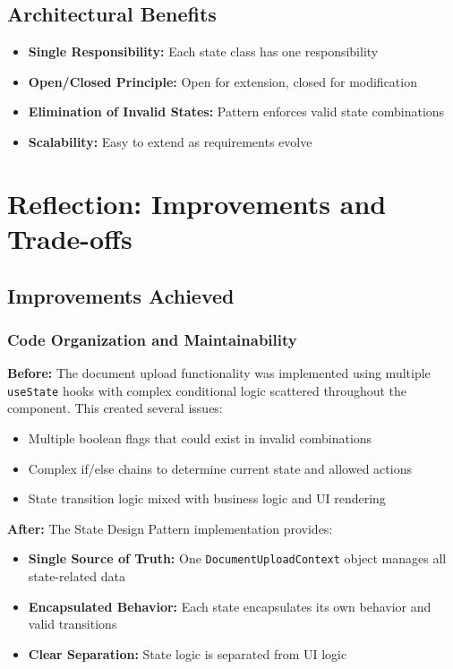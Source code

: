 \documentclass[11pt,a4paper]{article}
\begin{document}
\subsection{Architectural Benefits}

\begin{itemize}
    \item \textbf{Single Responsibility:} Each state class has one responsibility
    \item \textbf{Open/Closed Principle:} Open for extension, closed for modification
    \item \textbf{Elimination of Invalid States:} Pattern enforces valid state combinations
    \item \textbf{Scalability:} Easy to extend as requirements evolve
\end{itemize}

\section{Reflection: Improvements and Trade-offs}

\subsection{Improvements Achieved}

\subsubsection{Code Organization and Maintainability}

\textbf{Before:} The document upload functionality was implemented using multiple \texttt{useState} hooks with complex conditional logic scattered throughout the component. This created several issues:
\begin{itemize}
    \item Multiple boolean flags that could exist in invalid combinations
    \item Complex if/else chains to determine current state and allowed actions
    \item State transition logic mixed with business logic and UI rendering
\end{itemize}

\textbf{After:} The State Design Pattern implementation provides:
\begin{itemize}
    \item \textbf{Single Source of Truth:} One \texttt{DocumentUploadContext} object manages all state-related data
    \item \textbf{Encapsulated Behavior:} Each state encapsulates its own behavior and valid transitions
    \item \textbf{Clear Separation:} State logic is separated from UI logic
\end{itemize}
\end{document}
